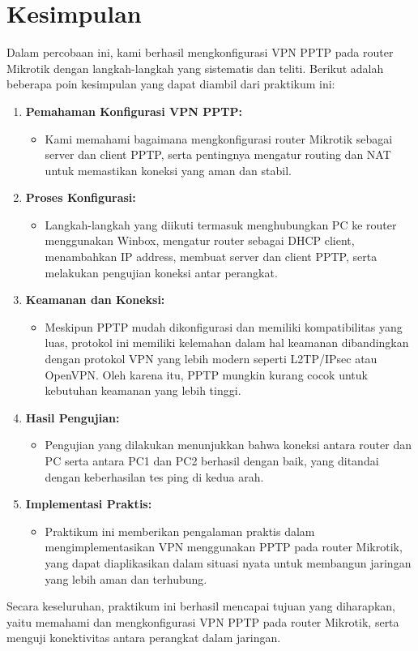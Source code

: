 \section*{Kesimpulan}

Dalam percobaan ini, kami berhasil mengkonfigurasi VPN PPTP pada router Mikrotik dengan langkah-langkah yang sistematis dan teliti. Berikut adalah beberapa poin kesimpulan yang dapat diambil dari praktikum ini:

\begin{enumerate}
    \item \textbf{Pemahaman Konfigurasi VPN PPTP:}
    \begin{itemize}
        \item Kami memahami bagaimana mengkonfigurasi router Mikrotik sebagai server dan client PPTP, serta pentingnya mengatur routing dan NAT untuk memastikan koneksi yang aman dan stabil.
    \end{itemize}

    \item \textbf{Proses Konfigurasi:}
    \begin{itemize}
        \item Langkah-langkah yang diikuti termasuk menghubungkan PC ke router menggunakan Winbox, mengatur router sebagai DHCP client, menambahkan IP address, membuat server dan client PPTP, serta melakukan pengujian koneksi antar perangkat.
    \end{itemize}

    \item \textbf{Keamanan dan Koneksi:}
    \begin{itemize}
        \item Meskipun PPTP mudah dikonfigurasi dan memiliki kompatibilitas yang luas, protokol ini memiliki kelemahan dalam hal keamanan dibandingkan dengan protokol VPN yang lebih modern seperti L2TP/IPsec atau OpenVPN. Oleh karena itu, PPTP mungkin kurang cocok untuk kebutuhan keamanan yang lebih tinggi.
    \end{itemize}

    \item \textbf{Hasil Pengujian:}
    \begin{itemize}
        \item Pengujian yang dilakukan menunjukkan bahwa koneksi antara router dan PC serta antara PC1 dan PC2 berhasil dengan baik, yang ditandai dengan keberhasilan tes ping di kedua arah.
    \end{itemize}

    \item \textbf{Implementasi Praktis:}
    \begin{itemize}
        \item Praktikum ini memberikan pengalaman praktis dalam mengimplementasikan VPN menggunakan PPTP pada router Mikrotik, yang dapat diaplikasikan dalam situasi nyata untuk membangun jaringan yang lebih aman dan terhubung.
    \end{itemize}
\end{enumerate}

Secara keseluruhan, praktikum ini berhasil mencapai tujuan yang diharapkan, yaitu memahami dan mengkonfigurasi VPN PPTP pada router Mikrotik, serta menguji konektivitas antara perangkat dalam jaringan.